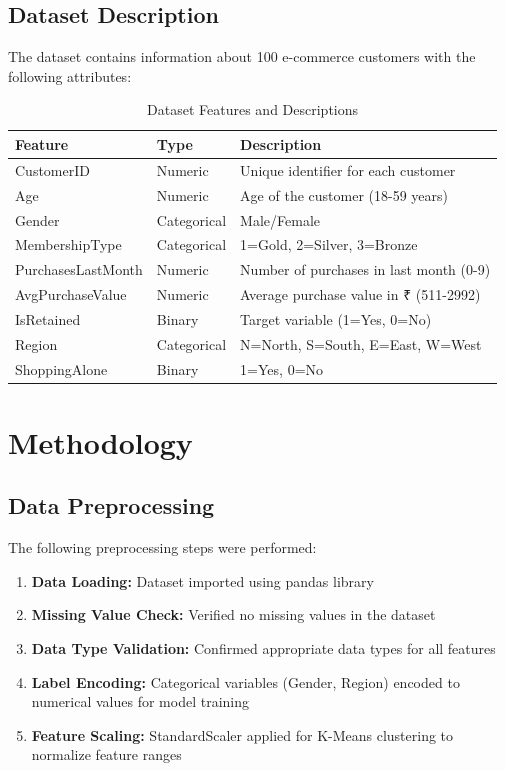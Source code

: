 \documentclass[12pt,a4paper]{article}
\begin{document}
\subsection{Dataset Description}
The dataset contains information about 100 e-commerce customers with the following attributes:

\begin{table}[H]
\centering
\begin{tabular}{@{}lll@{}}
\toprule
\textbf{Feature} & \textbf{Type} & \textbf{Description} \\ \midrule
CustomerID & Numeric & Unique identifier for each customer \\
Age & Numeric & Age of the customer (18-59 years) \\
Gender & Categorical & Male/Female \\
MembershipType & Categorical & 1=Gold, 2=Silver, 3=Bronze \\
PurchasesLastMonth & Numeric & Number of purchases in last month (0-9) \\
AvgPurchaseValue & Numeric & Average purchase value in ₹ (511-2992) \\
IsRetained & Binary & Target variable (1=Yes, 0=No) \\
Region & Categorical & N=North, S=South, E=East, W=West \\
ShoppingAlone & Binary & 1=Yes, 0=No \\ \bottomrule
\end{tabular}
\caption{Dataset Features and Descriptions}
\end{table}

\section{Methodology}

\subsection{Data Preprocessing}
The following preprocessing steps were performed:
\begin{enumerate}
    \item \textbf{Data Loading:} Dataset imported using pandas library
    \item \textbf{Missing Value Check:} Verified no missing values in the dataset
    \item \textbf{Data Type Validation:} Confirmed appropriate data types for all features
    \item \textbf{Label Encoding:} Categorical variables (Gender, Region) encoded to numerical values for model training
    \item \textbf{Feature Scaling:} StandardScaler applied for K-Means clustering to normalize feature ranges
\end{enumerate}
\end{document}
